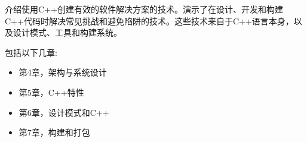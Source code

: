 
介绍使用C++创建有效的软件解决方案的技术。演示了在设计、开发和构建C++代码时解决常见挑战和避免陷阱的技术。这些技术来自于C++语言本身，以及设计模式、工具和构建系统。

包括以下几章:

\begin{itemize}
\item 第4章，架构与系统设计
\item 第5章，C++特性
\item 第6章，设计模式和C++
\item 第7章，构建和打包
\end{itemize}